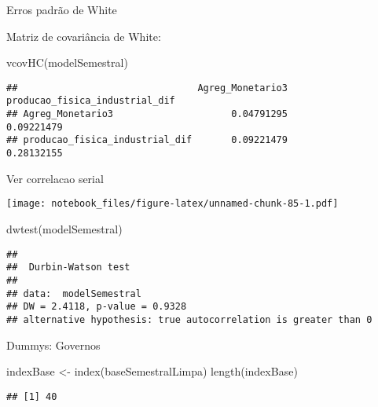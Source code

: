 \documentclass[
]{article}
\newenvironment{Shaded}{\begin{snugshade}}{\end{snugshade}}
\newcommand{\AttributeTok}[1]{\textcolor[rgb]{0.77,0.63,0.00}{#1}}
\newcommand{\FunctionTok}[1]{\textcolor[rgb]{0.00,0.00,0.00}{#1}}
\newcommand{\NormalTok}[1]{#1}
\newcommand{\OtherTok}[1]{\textcolor[rgb]{0.56,0.35,0.01}{#1}}
\newcommand{\SpecialCharTok}[1]{\textcolor[rgb]{0.00,0.00,0.00}{#1}}
\begin{document}
Erros padrão de White

Matriz de covariância de White:

\begin{Shaded}
\begin{Highlighting}[]
\FunctionTok{vcovHC}\NormalTok{(modelSemestral)}
\end{Highlighting}
\end{Shaded}

\begin{verbatim}
##                                Agreg_Monetario3 producao_fisica_industrial_dif
## Agreg_Monetario3                     0.04791295                     0.09221479
## producao_fisica_industrial_dif       0.09221479                     0.28132155
\end{verbatim}

Ver correlacao serial

\begin{Shaded}
\end{Shaded}

\texttt{[image: notebook\_files/figure-latex/unnamed-chunk-85-1.pdf]}

\begin{Shaded}
\begin{Highlighting}[]
\FunctionTok{dwtest}\NormalTok{(modelSemestral)}
\end{Highlighting}
\end{Shaded}

\begin{verbatim}
## 
##  Durbin-Watson test
## 
## data:  modelSemestral
## DW = 2.4118, p-value = 0.9328
## alternative hypothesis: true autocorrelation is greater than 0
\end{verbatim}

Dummys: Governos

\begin{Shaded}
\begin{Highlighting}[]
\NormalTok{indexBase }\OtherTok{\textless{}{-}} \FunctionTok{index}\NormalTok{(baseSemestralLimpa)}
\FunctionTok{length}\NormalTok{(indexBase)}
\end{Highlighting}
\end{Shaded}

\begin{verbatim}
## [1] 40
\end{verbatim}
\end{document}
